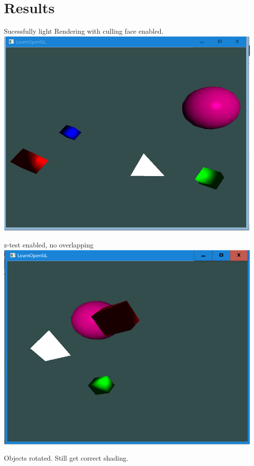 \documentclass[acmtog]{acmart}
\begin{document}
\section{Results}
Sucessfully light Rendering with culling face enabled.\\
\includegraphics[scale=0.5]{0}
\par z-test enabled, no overlapping\\
\includegraphics[scale=0.5]{1}
\par Objects rotated. Still get correct shading.\\
\end{document}

